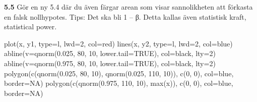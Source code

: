 \documentclass[
  letterpaper,
  DIV=11,
  numbers=noendperiod]{scrartcl}
\newenvironment{Shaded}{\begin{snugshade}}{\end{snugshade}}
\newcommand{\AttributeTok}[1]{\textcolor[rgb]{0.40,0.45,0.13}{#1}}
\newcommand{\ConstantTok}[1]{\textcolor[rgb]{0.56,0.35,0.01}{#1}}
\newcommand{\DecValTok}[1]{\textcolor[rgb]{0.68,0.00,0.00}{#1}}
\newcommand{\FloatTok}[1]{\textcolor[rgb]{0.68,0.00,0.00}{#1}}
\newcommand{\FunctionTok}[1]{\textcolor[rgb]{0.28,0.35,0.67}{#1}}
\newcommand{\NormalTok}[1]{\textcolor[rgb]{0.00,0.23,0.31}{#1}}
\newcommand{\StringTok}[1]{\textcolor[rgb]{0.13,0.47,0.30}{#1}}
\begin{document}
\textbf{5.5} Gör en ny 5.4 där du även färgar arean som visar
sannolikheten att förkasta en falsk nollhypotes. Tips: Det ska bli 1 --
β. Detta kallas även statistisk kraft, statistical power.

\begin{Shaded}
\begin{Highlighting}[]
\FunctionTok{plot}\NormalTok{(x, y1, }\AttributeTok{type=}\StringTok{\textquotesingle{}l\textquotesingle{}}\NormalTok{, }\AttributeTok{lwd=}\DecValTok{2}\NormalTok{, }\AttributeTok{col=}\StringTok{\textquotesingle{}red\textquotesingle{}}\NormalTok{)}
\FunctionTok{lines}\NormalTok{(x, y2, }\AttributeTok{type=}\StringTok{\textquotesingle{}l\textquotesingle{}}\NormalTok{, }\AttributeTok{lwd=}\DecValTok{2}\NormalTok{, }\AttributeTok{col=}\StringTok{\textquotesingle{}blue\textquotesingle{}}\NormalTok{)}
\FunctionTok{abline}\NormalTok{(}\AttributeTok{v=}\FunctionTok{qnorm}\NormalTok{(}\FloatTok{0.025}\NormalTok{, }\DecValTok{80}\NormalTok{, }\DecValTok{10}\NormalTok{, }\AttributeTok{lower.tail=}\ConstantTok{TRUE}\NormalTok{), }\AttributeTok{col=}\StringTok{\textquotesingle{}black\textquotesingle{}}\NormalTok{, }\AttributeTok{lty=}\DecValTok{2}\NormalTok{)}
\FunctionTok{abline}\NormalTok{(}\AttributeTok{v=}\FunctionTok{qnorm}\NormalTok{(}\FloatTok{0.975}\NormalTok{, }\DecValTok{80}\NormalTok{, }\DecValTok{10}\NormalTok{, }\AttributeTok{lower.tail=}\ConstantTok{TRUE}\NormalTok{), }\AttributeTok{col=}\StringTok{\textquotesingle{}black\textquotesingle{}}\NormalTok{, }\AttributeTok{lty=}\DecValTok{2}\NormalTok{)}
\FunctionTok{polygon}\NormalTok{(}\FunctionTok{c}\NormalTok{(}\FunctionTok{qnorm}\NormalTok{(}\FloatTok{0.025}\NormalTok{, }\DecValTok{80}\NormalTok{, }\DecValTok{10}\NormalTok{), }\FunctionTok{qnorm}\NormalTok{(}\FloatTok{0.025}\NormalTok{, }\DecValTok{110}\NormalTok{, }\DecValTok{10}\NormalTok{)), }\FunctionTok{c}\NormalTok{(}\DecValTok{0}\NormalTok{, }\DecValTok{0}\NormalTok{), }\AttributeTok{col=}\StringTok{\textquotesingle{}blue\textquotesingle{}}\NormalTok{, }\AttributeTok{border=}\ConstantTok{NA}\NormalTok{)}
\FunctionTok{polygon}\NormalTok{(}\FunctionTok{c}\NormalTok{(}\FunctionTok{qnorm}\NormalTok{(}\FloatTok{0.975}\NormalTok{, }\DecValTok{110}\NormalTok{, }\DecValTok{10}\NormalTok{), }\FunctionTok{max}\NormalTok{(x)), }\FunctionTok{c}\NormalTok{(}\DecValTok{0}\NormalTok{, }\DecValTok{0}\NormalTok{), }\AttributeTok{col=}\StringTok{\textquotesingle{}blue\textquotesingle{}}\NormalTok{, }\AttributeTok{border=}\ConstantTok{NA}\NormalTok{)}


\end{Highlighting}
\end{Shaded}
\end{document}
